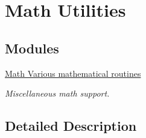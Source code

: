 \hypertarget{group___tau_labs_math}{\section{Math Utilities}
\label{group___tau_labs_math}
}
\subsection*{Modules}
\begin{DoxyCompactItemize}
\item 
\hyperlink{group___miscellaneous_math}{Math Various mathematical routines}
\begin{DoxyCompactList}\small\item\em Miscellaneous math support. \end{DoxyCompactList}\end{DoxyCompactItemize}


\subsection{Detailed Description}
